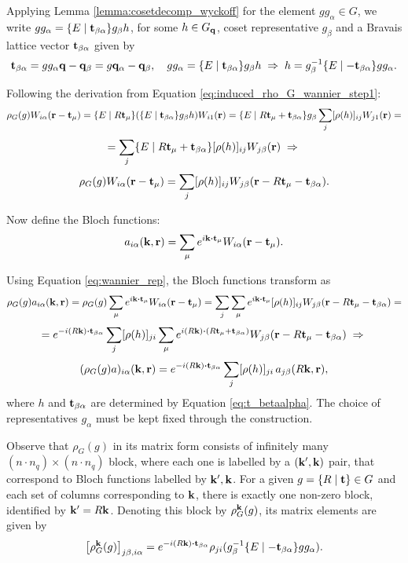 Applying Lemma \ref{lemma:cosetdecomp_wyckoff} for the element $g g_\alpha \in G$, we write $g g_\alpha = \{ E \mid {\vb{t}}_{\beta\alpha} \} g_\beta h$, for some $h \in G_{\vb{q}}$, coset representative $g_\beta$ and a Bravais lattice vector ${\vb{t}}_{\beta\alpha}$ given by
\begin{equation} \label{eq:t_betaalpha}
{\vb{t}}_{\beta\alpha} = gg_\alpha {\vb{q}} - {\vb{q}}_\beta = g {\vb{q}}_\alpha - {\vb{q}}_\beta, \quad
g g_\alpha = \{ E \mid {\vb{t}}_{\beta\alpha} \} g_\beta h \; \Rightarrow \; h = g_\beta^{-1} \{E\mid -{\vb{t}}_{\beta\alpha}\} g g_\alpha.
\end{equation}

Following the derivation from Equation \ref{eq:induced_rho_G_wannier_step1}:
$$
\rho_G(g) W_{i\alpha}({\vb{r}}-{\vb{t}}_\mu) =
\{ E \mid R{\vb{t}}_\mu \} \qty(\{ E \mid {\vb{t}}_{\beta\alpha} \} g_\beta h) W_{i1}({\vb{r}}) =
\{ E \mid R{\vb{t}}_\mu + {\vb{t}}_{\beta\alpha} \} g_\beta \sum_{j} [\rho(h)]_{ij} W_{j1}({\vb{r}}) =
$$
$$
= \sum_{j} \{ E \mid R{\vb{t}}_\mu + {\vb{t}}_{\beta\alpha} \} [\rho(h)]_{ij} W_{j\beta}({\vb{r}}) \; \Rightarrow \;
$$
\begin{equation} \label{eq:wannier_rep}
\rho_G(g) W_{i\alpha}({\vb{r}}-{\vb{t}}_\mu) = \sum_{j} [\rho(h)]_{ij} W_{j\beta}({\vb{r}} - R{\vb{t}}_\mu - {\vb{t}}_{\beta\alpha}).
\end{equation}

\n

Now define the Bloch functions:
\begin{equation} \label{eq:bloch_functions}
a_{i\alpha}(\k, \r) = \sum_{\mu} e^{i\k\vdot\t_\mu} W_{i\alpha}(\r-\t_\mu).
\end{equation}

Using Equation \ref{eq:wannier_rep}, the Bloch functions transform as
$$
\rho_G(g) a_{i\alpha}(\k,\r) =
\rho_G(g) \sum_{\mu} e^{i\k\vdot\t_\mu} W_{i\alpha}(\r-\t_\mu) =
\sum_{j} \sum_{\mu} e^{i\k\vdot\t_\mu} [\rho(h)]_{ij} W_{j\beta}(\r-R\t_\mu-\t_{\beta\alpha}) =
$$
$$
= e^{-i(R\k)\vdot\t_{\beta\alpha}} \sum_{j} [\rho(h)]_{ji} \sum_{\mu} e^{i(R\k)\vdot(R\t_\mu+\t_{\beta\alpha})} W_{j\beta}(\r-R\t_\mu-\t_{\beta\alpha}) \implies
$$
\begin{equation} \label{eq:bloch_rep}
(\rho_G(g) a)_{i\alpha}(\k,\r) = e^{-i(R\k)\vdot\t_{\beta\alpha}} \sum_{j} [\rho(h)]_{ji} \, a_{j\beta}(R\k, \r),
\end{equation}
where $h$ and ${\vb{t}}_{\beta\alpha}$ are determined by Equation \ref{eq:t_betaalpha}. The choice of representatives $g_\alpha$ must be kept fixed through the construction.

Observe that $\rho_G(g)$ in its matrix form consists of infinitely many $(n\cdot n_q)\times (n\cdot n_q)$ block, where each one is labelled by a $({\vb{k}}', {\vb{k}})$ pair, that correspond to Bloch functions labelled by ${\vb{k}}', {\vb{k}}$. For a given $g = \{ R \mid {\vb{t}} \} \in G$ and each set of columns corresponding to ${\vb{k}}$, there is exactly one non-zero block, identified by ${\vb{k}}' = R{\vb{k}}$. Denoting this block by $\rho_G^{\vb{k}}(g)$, its matrix elements are given by
\begin{equation} \label{eq:k_block_inducedrep_jbia}
\qty[\rho_G^\k(g)]_{j\beta,i\alpha} = e^{-i(R\k)\vdot\t_{\beta\alpha}}\rho_{ji}(g_\beta^{-1}\sg{E}{-\t_{\beta\alpha}}gg_\alpha).
\end{equation}

